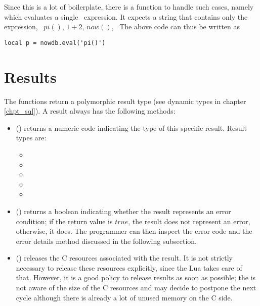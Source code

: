 Since this is a lot of boilerplate,
there is a function to handle such cases,
namely  which evaluates
a single \sql\ expression.
It expects a string that
contains only the expression, \eg\
$pi()$, $1+2$, $now()$, \etc\
The above code can thus be written as

\begin{lua}
\begin{lstlisting}
local p = nowdb.eval('pi()')
\end{lstlisting}
\end{lua}

\clearpage
\section{Results}
The  functions return
a polymorphic result type (see dynamic types
in chapter \ref{chpt_sql}).
A result always has the following methods:
\begin{itemize}
\item {}()
      returns a numeric code indicating
      the type of this specific result.
      Result types are:
      \begin{itemize}
      \item {}
      \item {}
      \item \term{nowdb.REPORT}
      \item {}
      \item {}
      \end{itemize}
\item {}()
      returns a boolean indicating whether
      the result represents an error condition;
      if the return value is $true$,
      the result does not represent an error,
      otherwise, it does.
      The programmer can then inspect the error code
      and the error details method discussed in the
      following subsection.
\item \term{release}()
      releases the C resources associated with the result.
      It is not strictly necessary to release these resources
      explicitly, since the Lua  takes care of that.
      However, it is a good policy to release results as soon
      as possible; the \acronym{gc} is not
      aware of the size of the C resources and may decide to
      postpone the next cycle although there is already
      a lot of unused memory on the C side.
\end{itemize}

